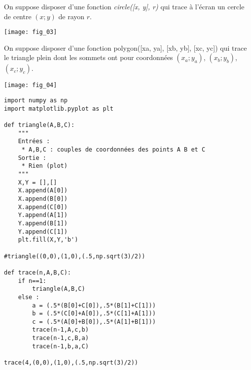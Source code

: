 


\exer{}
\setcounter{question}{0}

On suppose disposer d’une fonction \textsl{circle([x, y], r)} qui trace à l’écran un cercle de centre
$(x;y)$ de rayon $r$. 


\begin{center}
\texttt{[image: fig\_03]}
\end{center}


\exer{}
\setcounter{question}{0}

On suppose disposer d’une fonction \textsf{polygon([xa, ya], [xb, yb], [xc, yc])} qui trace le
triangle plein dont les sommets ont pour coordonnées $(x_a;y_a)$, $(x_b;y_b)$, $(x_c;y_c)$. 


\begin{center}
\texttt{[image: fig\_04]}
\end{center}

\ifprof
\begin{corrige}
\begin{lstlisting}
import numpy as np
import matplotlib.pyplot as plt

def triangle(A,B,C):
    """
    Entrées :
     * A,B,C : couples de coordonnées des points A B et C
    Sortie : 
     * Rien (plot) 
    """
    X,Y = [],[]
    X.append(A[0])
    X.append(B[0])
    X.append(C[0])
    Y.append(A[1])
    Y.append(B[1])
    Y.append(C[1])
    plt.fill(X,Y,'b')

#triangle((0,0),(1,0),(.5,np.sqrt(3)/2))

def trace(n,A,B,C):
    if n==1:
        triangle(A,B,C)
    else :
        a = (.5*(B[0]+C[0]),.5*(B[1]+C[1]))
        b = (.5*(C[0]+A[0]),.5*(C[1]+A[1]))
        c = (.5*(A[0]+B[0]),.5*(A[1]+B[1]))
        trace(n-1,A,c,b)
        trace(n-1,c,B,a)
        trace(n-1,b,a,C)
        
trace(4,(0,0),(1,0),(.5,np.sqrt(3)/2))        
\end{lstlisting}
\end{corrige}
\else
\fi



